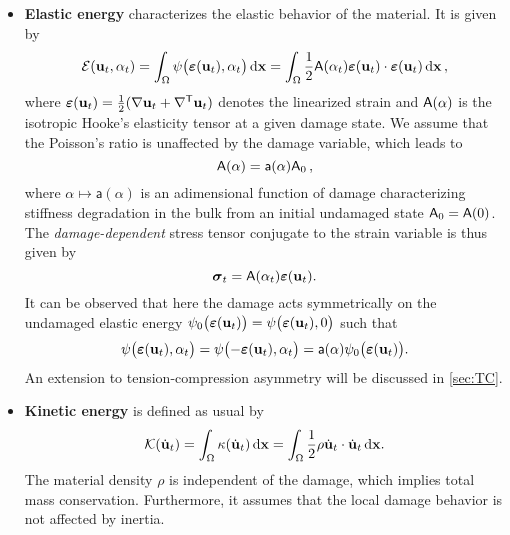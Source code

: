 \begin{itemize}
\item \textbf{Elastic energy} characterizes the elastic behavior of the material. It is given by
\begin{equation} \label{eq:elasticG}
\mathcal{E}(\vec{u}_t,\alpha_t)=\int_\Omega\psi\bigl(\eps(\vec{u}_t),\alpha_t\bigr)\dx=\int_\Omega\frac{1}{2}\tens{A}(\alpha_t)\eps(\vec{u}_t)\cdot\eps(\vec{u}_t)\dx\,,
\end{equation}
where $\eps(\vec{u}_t)=\frac{1}{2}(\nabla\vec{u}_t+\nabla^\mT\vec{u}_t)$ denotes the linearized strain and $\mathsf{A}(\alpha)$ is the isotropic Hooke's elasticity tensor at a given damage state. We assume that the Poisson's ratio is unaffected by the damage variable, which leads to
\[
\mathsf{A}(\alpha)=\mathsf{a}(\alpha)\mathsf{A}_0\,,
\]
where $\alpha\mapsto\mathsf{a}(\alpha)$ is an adimensional function of damage characterizing stiffness degradation in the bulk from an initial undamaged state $\mathsf{A}_0=\mathsf{A}(0)$. The \emph{damage-dependent} stress tensor conjugate to the strain variable is thus given by
\begin{equation} \label{eq:stress}
\sig_t=\tens{A}(\alpha_t)\eps(\vec{u}_t).
\end{equation}
It can be observed that here the damage acts symmetrically on the undamaged elastic energy $\psi_0\bigl(\eps(\vec{u}_t)\bigr)=\psi\bigl(\eps(\vec{u}_t),0\bigr)$ such that
\begin{equation} \label{eq:psi0}
\psi\bigl(\eps(\vec{u}_t),\alpha_t\bigr)=\psi\bigl(-\eps(\vec{u}_t),\alpha_t\bigr)=\mathsf{a}(\alpha)\psi_0\bigl(\eps(\vec{u}_t)\bigr).
\end{equation}
An extension to tension-compression asymmetry will be discussed in \cref{sec:TC}.

\item \textbf{Kinetic energy} is defined as usual by
\begin{equation} \label{eq:kineticG}
\mathcal{K}(\dot{\vec{u}}_t)=\int_\Omega\kappa(\dot{\vec{u}}_t)\dx=\int_\Omega\frac{1}{2}\rho\dot{\vec{u}}_t\cdot\dot{\vec{u}}_t\dx.
\end{equation}
The material density $\rho$ is independent of the damage, which implies total mass conservation. Furthermore, it assumes that the local damage behavior is not affected by inertia.


\end{itemize}
